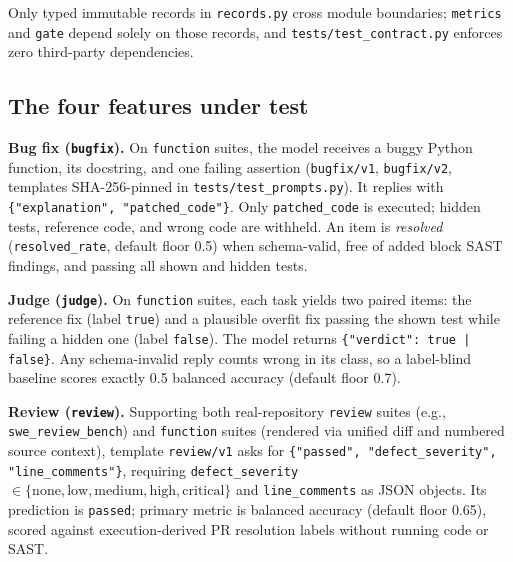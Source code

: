 \documentclass[conference]{IEEEtran}
\begin{document}
Only typed immutable records in \texttt{records.\allowbreak{}py} cross module boundaries; \texttt{metrics} and \texttt{gate} depend solely on those records, and \texttt{tests/\allowbreak{}test\_\allowbreak{}contract.\allowbreak{}py} enforces zero third-party dependencies.

\subsection{The four features under test}
\label{sec:design-features}

\textbf{Bug fix (\texttt{bugfix}).} On \texttt{function} suites, the model receives a buggy Python function, its docstring, and one failing assertion (\texttt{bugfix/\allowbreak{}v1}, \texttt{bugfix/\allowbreak{}v2}, templates SHA-256-pinned in \texttt{tests/\allowbreak{}test\_\allowbreak{}prompts.\allowbreak{}py}). It replies with \texttt{\{"explanation", "patched\_\allowbreak{}code"\}}. Only \texttt{patched\_\allowbreak{}code} is executed; hidden tests, reference code, and wrong code are withheld. An item is \emph{resolved} (\texttt{resolved\_\allowbreak{}rate}, default floor 0.5) when schema-valid, free of added block SAST findings, and passing all shown and hidden tests.

\textbf{Judge (\texttt{judge}).} On \texttt{function} suites, each task yields two paired items: the reference fix (label \texttt{true}) and a plausible overfit fix passing the shown test while failing a hidden one (label \texttt{false}). The model returns \texttt{\{"verdict": true | false\}}. Any schema-invalid reply counts wrong in its class, so a label-blind baseline scores exactly 0.5 balanced accuracy (default floor 0.7).

\textbf{Review (\texttt{review}).} Supporting both real-repository \texttt{review} suites (e.g., \texttt{swe\_\allowbreak{}review\_\allowbreak{}bench}) and \texttt{function} suites (rendered via unified diff and numbered source context), template \texttt{review/\allowbreak{}v1} asks for \texttt{\{"passed", "defect\_\allowbreak{}severity", "line\_\allowbreak{}comments"\}}, requiring \texttt{defect\_\allowbreak{}severity} $\in \{\text{none}, \text{low}, \text{medium}, \text{high}, \text{critical}\}$ and \texttt{line\_\allowbreak{}comments} as JSON objects. Its prediction is \texttt{passed}; primary metric is balanced accuracy (default floor 0.65), scored against execution-derived PR resolution labels without running code or SAST.
\end{document}
